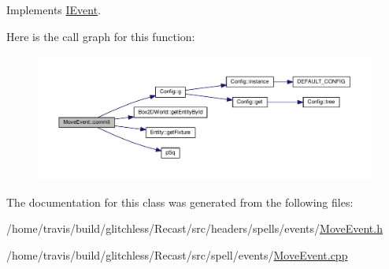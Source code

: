 Implements \hyperlink{class_i_event_a5422b83a412e52b68c7885b53a421e0e}{I\-Event}.



Here is the call graph for this function\-:
\nopagebreak
\begin{figure}[H]
\begin{center}
\leavevmode
\includegraphics[width=350pt]{class_move_event_a409faa8726fad01a66fe86d61369fcaf_cgraph}
\end{center}
\end{figure}




The documentation for this class was generated from the following files\-:\begin{DoxyCompactItemize}
\item 
/home/travis/build/glitchless/\-Recast/src/headers/spells/events/\hyperlink{_move_event_8h}{Move\-Event.\-h}\item 
/home/travis/build/glitchless/\-Recast/src/spell/events/\hyperlink{_move_event_8cpp}{Move\-Event.\-cpp}\end{DoxyCompactItemize}
